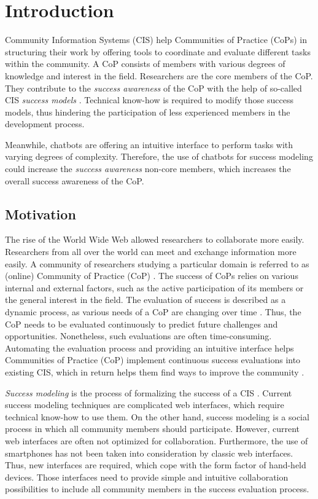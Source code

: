 \chapter{Introduction}
Community Information Systems (CIS) help Communities of Practice (CoPs) in structuring their work by offering tools to coordinate and evaluate different tasks within the community.
A CoP consists of members with various degrees of knowledge and interest in the field.
Researchers are the core members of the CoP.
They contribute to the \emph{success awareness} of the CoP with the help of so-called CIS \emph{success models} \cite{Klam10c}.
Technical know-how is required to modify those success models, thus hindering the participation of less experienced members
in the development process.

Meanwhile, chatbots are offering an intuitive interface to perform tasks with varying degrees of complexity. 
Therefore, the use of chatbots for success modeling could increase the \emph{success awareness} non-core members, which increases the overall success awareness of the CoP.

\section{Motivation}
The rise of the World Wide Web allowed researchers to collaborate more easily. Researchers from all over the world can meet and exchange information more easily. A community of researchers studying a particular domain is referred to as (online) Community of Practice (CoP) \cite{Renz08}.
The success of CoPs relies on various internal and external factors, such as the active participation of its members or the general interest in the field.
The evaluation of success is described as a dynamic process, as various needs of a CoP are changing over time \cite{Renz08,GKJa08}.
Thus, the CoP needs to be evaluated continuously to predict future challenges and opportunities.
Nonetheless, such evaluations are often time-consuming. Automating the evaluation process and providing an intuitive interface helps Communities of Practice (CoP) implement continuous success evaluations into existing CIS, which in return helps them find ways to improve the community \cite{Renz08}.

\emph{Success modeling} is the process of formalizing the success of a CIS \cite{Renz16}. 
Current success modeling techniques are complicated web interfaces, which require technical know-how to use them.
On the other hand, success modeling is a social process in which all community members should participate. However, current web interfaces are often not optimized for collaboration.
Furthermore, the use of smartphones has not been taken into consideration by classic web interfaces.
Thus, new interfaces are required, which cope with the form factor of hand-held devices. Those interfaces need to provide simple and intuitive collaboration possibilities to include all community members in the success evaluation process. 

